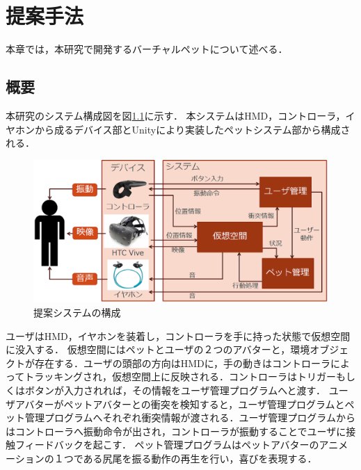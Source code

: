 ﻿\chapter{提案手法}
本章では，本研究で開発するバーチャルペットについて述べる．

\section{概要}



本研究のシステム構成図を図\ref{fig:design1}に示す．
本システムはHMD，コントローラ，イヤホンから成るデバイス部とUnityにより実装したペットシステム部から構成される．

\begin{figure}[H]
\centering
\includegraphics*[width=15cm,clip]{images/design1.eps}
\caption{提案システムの構成}
\label{fig:design1}
\end{figure}

ユーザはHMD，イヤホンを装着し，コントローラを手に持った状態で仮想空間に没入する．
仮想空間にはペットとユーザの２つのアバターと，環境オブジェクトが存在する．ユーザの頭部の方向はHMDに，手の動きはコントローラによってトラッキングされ，仮想空間上に反映される．コントローラはトリガーもしくはボタンが入力されれば，その情報をユーザ管理プログラムへと渡す．
ユーザアバターがペットアバターとの衝突を検知すると，ユーザ管理プログラムとペット管理プログラムへそれぞれ衝突情報が渡される．ユーザ管理プログラムからはコントローラへ振動命令が出され，コントローラが振動することでユーザに接触フィードバックを起こす．
ペット管理プログラムはペットアバターのアニメーションの１つである尻尾を振る動作の再生を行い，喜びを表現する．

